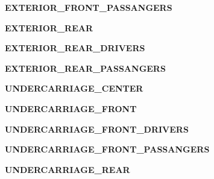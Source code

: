 \begin{DoxyCompactItemize}
\item 
\hypertarget{enumEnums_1_1Location_a020dd9d9b0d4446778e482ba4ae3cdf5}{}{\bfseries E\+X\+T\+E\+R\+I\+O\+R\+\_\+\+F\+R\+O\+N\+T\+\_\+\+P\+A\+S\+S\+A\+N\+G\+E\+R\+S}\label{enumEnums_1_1Location_a020dd9d9b0d4446778e482ba4ae3cdf5}

\item 
\hypertarget{enumEnums_1_1Location_ade6f1d6a6a1b104ce44cb5c68cb0bc1e}{}{\bfseries E\+X\+T\+E\+R\+I\+O\+R\+\_\+\+R\+E\+A\+R}\label{enumEnums_1_1Location_ade6f1d6a6a1b104ce44cb5c68cb0bc1e}

\item 
\hypertarget{enumEnums_1_1Location_ae4cd8a3f2fb602455b938835a083515c}{}{\bfseries E\+X\+T\+E\+R\+I\+O\+R\+\_\+\+R\+E\+A\+R\+\_\+\+D\+R\+I\+V\+E\+R\+S}\label{enumEnums_1_1Location_ae4cd8a3f2fb602455b938835a083515c}

\item 
\hypertarget{enumEnums_1_1Location_ac01bf78e631edbd5e4ea3b158d2dcb4c}{}{\bfseries E\+X\+T\+E\+R\+I\+O\+R\+\_\+\+R\+E\+A\+R\+\_\+\+P\+A\+S\+S\+A\+N\+G\+E\+R\+S}\label{enumEnums_1_1Location_ac01bf78e631edbd5e4ea3b158d2dcb4c}

\item 
\hypertarget{enumEnums_1_1Location_ad3c641049489bcaea8b3d680d9575328}{}{\bfseries U\+N\+D\+E\+R\+C\+A\+R\+R\+I\+A\+G\+E\+\_\+\+C\+E\+N\+T\+E\+R}\label{enumEnums_1_1Location_ad3c641049489bcaea8b3d680d9575328}

\item 
\hypertarget{enumEnums_1_1Location_aabe6bf80be2ae7ac225179af8c15e26c}{}{\bfseries U\+N\+D\+E\+R\+C\+A\+R\+R\+I\+A\+G\+E\+\_\+\+F\+R\+O\+N\+T}\label{enumEnums_1_1Location_aabe6bf80be2ae7ac225179af8c15e26c}

\item 
\hypertarget{enumEnums_1_1Location_ae236d0d1a856f35711765306d502ee37}{}{\bfseries U\+N\+D\+E\+R\+C\+A\+R\+R\+I\+A\+G\+E\+\_\+\+F\+R\+O\+N\+T\+\_\+\+D\+R\+I\+V\+E\+R\+S}\label{enumEnums_1_1Location_ae236d0d1a856f35711765306d502ee37}

\item 
\hypertarget{enumEnums_1_1Location_a58e9ee84dacc5ca43e97824d067f0c16}{}{\bfseries U\+N\+D\+E\+R\+C\+A\+R\+R\+I\+A\+G\+E\+\_\+\+F\+R\+O\+N\+T\+\_\+\+P\+A\+S\+S\+A\+N\+G\+E\+R\+S}\label{enumEnums_1_1Location_a58e9ee84dacc5ca43e97824d067f0c16}

\item 
\hypertarget{enumEnums_1_1Location_af02c59baa614b42d5db0b4d70473aa3c}{}{\bfseries U\+N\+D\+E\+R\+C\+A\+R\+R\+I\+A\+G\+E\+\_\+\+R\+E\+A\+R}\label{enumEnums_1_1Location_af02c59baa614b42d5db0b4d70473aa3c}


\end{DoxyCompactItemize}
